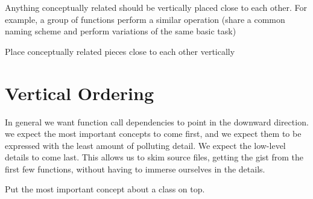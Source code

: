 Anything conceptually related should be vertically placed close to each other. For example, a group of functions perform a similar operation (share a common naming
scheme and perform variations of the same basic task)

\begin{marker}
Place conceptually related pieces close to each other vertically
\end{marker}

\section{Vertical Ordering}

In general we want function call dependencies to point in the downward direction. we expect the most important concepts to come first, and we expect them to be expressed with the least amount of polluting detail. We expect the low-level details to come last. This allows us to skim source files, getting the gist from the first few functions, without having to immerse ourselves in the details.

\begin{marker}
Put the most important concept about a class on top.
\end{marker}
